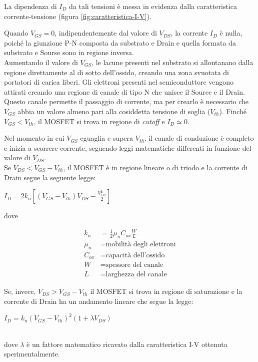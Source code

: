 La dipendenza di $I_D$ da tali tensioni è messa in evidenza dalla caratteristica corrente-tensione (figura \ref{fig:caratteristica-I-V}).

Quando $V_{GS} = 0$, indipendentemente dal valore di $V_{DS}$, la corrente $I_D$ è nulla, poiché la giunzione P-N composta da substrato e Drain e quella formata da substrato e Sourse sono in regione inversa. \\
Aumentando il valore di $V_{GS}$, le lacune presenti nel substrato si allontanano dalla regione direttamente al di sotto dell'ossido, creando una
zona svuotata di portatori di carica liberi. Gli elettroni presenti nel semiconduttore
vengono attirati creando una regione di canale di tipo N che unisce il
Source e il Drain. Questo canale permette il passaggio di corrente, ma per crearlo è necessario che $V_{GS}$ abbia un valore almeno pari alla cosiddetta tensione di soglia ($V_{th}$). Finché $V_{GS} < V_{th}$, il MOSFET si trova in regione di \emph{cutoff} e $I_D \simeq 0$.

Nel momento in cui $V_{GS}$ eguaglia e supera $V_{th}$, il canale di conduzione è completo e inizia a scorrere corrente, seguendo leggi matematiche differenti in funzione del valore di $V_{DS}$.\\

Se $V_{DS} < V_{GS} -  V_{th}$, il MOSFET è in regione lineare o di triodo e la corrente di Drain segue la seguente legge:\\
\centerline{ $I_D = 2k_n\left[ \left(V_{GS}-V_{th}\right)V_{DS} - \frac{V_{DS}^2}{2}\right]$}

dove

\begin{align*}
   k_n &= \frac{1}{2}\mu_n C_{ox}\frac{W}{L} \\
   \mu_n &= \text{mobilità degli elettroni} \\
   C_{ox} &= \text{capacità dell'ossido} \\
   W &= \text{spessore del canale} \\
   L &= \text{larghezza del canale}
\end{align*}

Se, invece, $V_{DS} > V_{GS} -  V_{th}$ il MOSFET si trova in regione di saturazione e la corrente di Drain ha un andamento lineare che segue la legge:\\
\centerline{ $I_D = k_n\left(V_{GS}-V_{th}\right)^2 (1+\lambda V_{DS})$}\\
dove $\lambda$ è un fattore matematico ricavato dalla caratteristica I-V ottenuta sperimentalmente.\\

